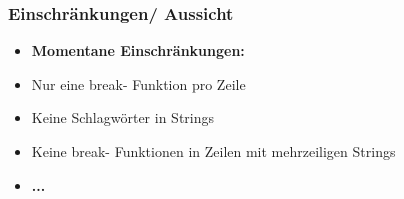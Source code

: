 \begin{frame}
	\frametitle{Einschränkungen/ Aussicht}
	\begin{itemize}
		\item[]\textbf{Momentane Einschränkungen:}
		\item[]Nur eine break- Funktion pro Zeile
		\item[]Keine Schlagwörter in Strings
		\item[]Keine break- Funktionen in Zeilen mit mehrzeiligen Strings
		\item[]\textbf{...}
	\end{itemize}
\end{frame}
